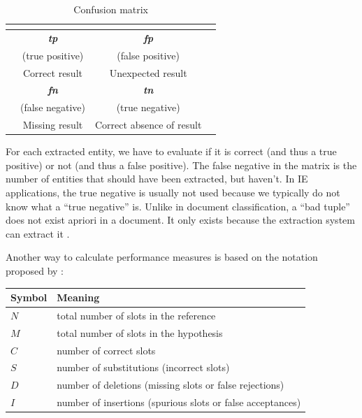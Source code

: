 \begin{table}[H]
\centering
\begin{tabular}{c|ccc}
	&  \\
	\toprule
	 & \textbf{\textit{tp}}  &  \textbf{\textit{fp}} \\
	& (true positive) &  (false positive) \\
	& Correct result &  Unexpected result \\
	&  \textbf{\textit{fn}} & \textbf{\textit{tn}} \\
	&  (false negative) & (true negative) \\
         &  Missing result & Correct absence of result
\end{tabular}
\caption{Confusion matrix}
\label{tab:confusion-matrix}
\end{table}

For each extracted entity, we have to evaluate if it is correct (and thus a true positive) or not (and thus a false positive). The false negative in the matrix is the number of entities that should have been extracted, but haven't. In IE applications, the true negative is usually not used \cite{Sitter:2004} because we typically do not know what a \enquote{true negative} is. Unlike in document classification, a \enquote{bad tuple} does not exist apriori in a document. It only exists because the extraction system can extract it \cite{Ipeirotis:2007}.

Another way to calculate performance measures is based on the notation proposed by \citeauthor{Makhoul:1999} \cite{Makhoul:1999}:

\begin{table}[H]
\centering
\begin{tabular*}{\textwidth}{ll}
	\toprule
	\textbf{Symbol} & \textbf{Meaning} \\
	\midrule
	$N$ & total number of slots in the reference \\
	$M$ & total number of slots in the hypothesis \\
	$C$ & number of correct slots \\
	$S$ & number of substitutions (incorrect slots) \\
	$D$ & number of deletions (missing slots or false rejections) \\
	$I$ & number of insertions (spurious slots or false acceptances) \\
	\bottomrule
\end{tabular*}
\end{table}


